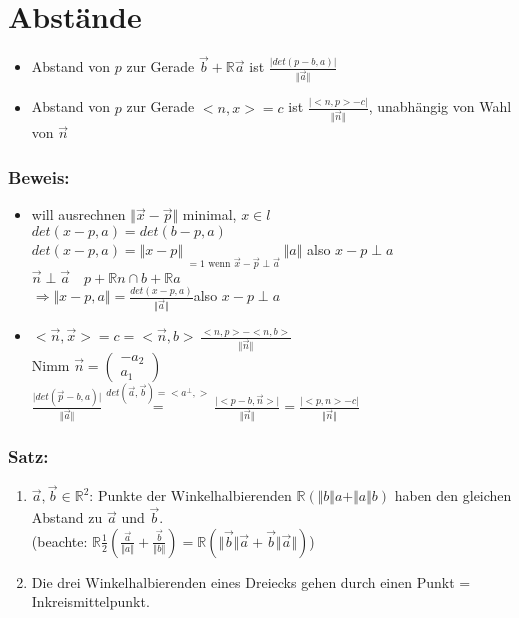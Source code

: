 \section{Abstände}
%
%
%
\begin{itemize}
	\item Abstand von $p$ zur Gerade $\vec{b} + \mathbb{R}\vec{a}$ ist $\frac{\vert 
	det(p-b,a)\vert}{\Vert\vec{a}\Vert}$ 
	\item Abstand von $p$ zur Gerade $<n,x>=c$ ist $ \frac{\vert <n,p>-c\vert}{\Vert 
	\vec{n}\Vert}$, unabhängig von Wahl von $\vec{n}$
\end{itemize}
%
%
%
\subsubsection{Beweis:}
\begin{itemize}
	\item will ausrechnen $\Vert\vec{x}-\vec{p}\Vert$ minimal, $x \in l$\\
	$det(x-p,a)=det(b-p,a)$\\
	$det(x-p,a)=\Vert x-p\Vert\mathop{\underbrace{\sin\measuredangle(b-
	p,a)}}\limits_{=1\text{ wenn }\vec{x}-\vec{p}\perp\vec{a}}\Vert a\Vert$ also $x-p 	
	\perp a$\\
	$\vec{n}\perp\vec{a} \quad p+\mathbb{R}n \cap b +\mathbb{R}a$\\
	$\Rightarrow \Vert x-p,a\Vert=\frac{det(x-p,a)}{\Vert\vec{a}\Vert}$also $x-p\perp a$
	
	\item $<\vec{n},\vec{x}>=c=<\vec{n},b> \, \frac{<n,p>-<n,b>}{\Vert\vec{n}\Vert}$\\
	Nimm $\vec{n}=\begin{pmatrix} -a_{2} \\ a_{1} \end{pmatrix}$\\
	$\frac{\vert det(\vec{p}-b,a)\vert}{\Vert\vec{a}\Vert} \mathop{=}\limits^{det(\vec{a},
	\vec{b})
	=<a^{\perp},>}\frac{\vert <p-b,\vec{n}> \vert}{\Vert\vec{n}\Vert}=\frac{\vert<p,n>-
	c\vert}{\Vert\vec{n}\Vert}$
\end{itemize}
%
%
%
\subsubsection{Satz:}
\begin{enumerate}
	\item $\vec{a},\vec{b}\in\mathbb{R}^{2}$: Punkte der Winkelhalbierenden  
	$\mathbb{R}(\Vert b\Vert a+\Vert a\Vert b)$ haben den gleichen Abstand zu 
	$\vec{a}$ und $\vec{b}$. \\
	(beachte: $\mathbb{R}\frac{1}{2}(\frac{\vec{a}}{\Vert a\Vert}+\frac{\vec{b}}{\Vert 
	b\Vert})=\mathbb{R}(\Vert \vec{b}\Vert\vec{a}+\vec{b}\Vert\vec{a}\Vert)$)
	\item Die drei Winkelhalbierenden eines Dreiecks gehen durch einen Punkt = 
	Inkreismittelpunkt.
\end{enumerate}
%
%
%
